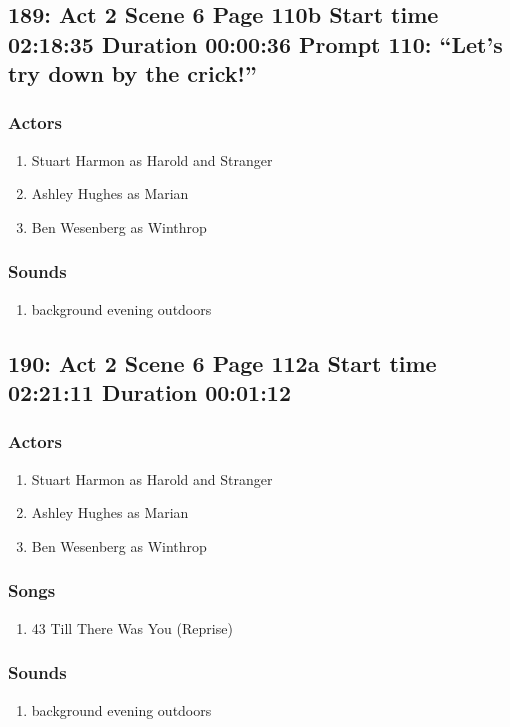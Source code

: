 \subsection{189: Act 2 Scene 6 Page 110b Start time 02:18:35 Duration 00:00:36 Prompt 110: ``Let's try down by the crick!''}

\subsubsection{Actors}
\begin{enumerate}
\item Stuart Harmon as Harold and Stranger
\item Ashley Hughes as Marian
\item Ben Wesenberg as Winthrop
\end{enumerate}

\subsubsection{Sounds}
\begin{enumerate}
\item background evening outdoors
\end{enumerate}
\subsection{190: Act 2 Scene 6 Page 112a Start time 02:21:11 Duration 00:01:12}

\subsubsection{Actors}
\begin{enumerate}
\item Stuart Harmon as Harold and Stranger
\item Ashley Hughes as Marian
\item Ben Wesenberg as Winthrop
\end{enumerate}

\subsubsection{Songs}
\begin{enumerate}
\item 43 Till There Was You (Reprise)
\end{enumerate}\subsubsection{Sounds}
\begin{enumerate}
\item background evening outdoors
\end{enumerate}
